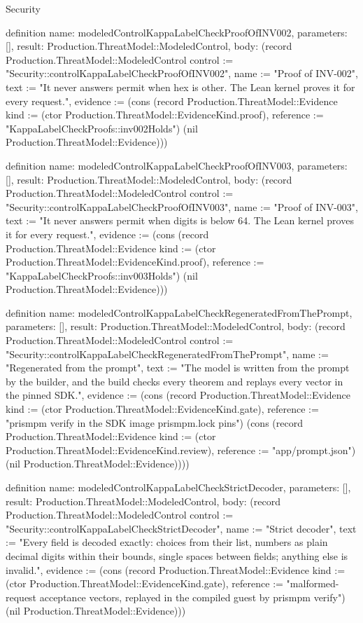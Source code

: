 \begin{lexlean}{Security}
\begin{semanticmodule}
definition{
  name: modeledControlKappaLabelCheckProofOfINV002,
  parameters: [],
  result: Production.ThreatModel::ModeledControl,
  body: (record Production.ThreatModel::ModeledControl {control := "Security::controlKappaLabelCheckProofOfINV002", name := "Proof of INV-002", text := "It never answers permit when hex is other. The Lean kernel proves it for every request.", evidence := (cons (record Production.ThreatModel::Evidence {kind := (ctor Production.ThreatModel::EvidenceKind.proof), reference := "KappaLabelCheckProofs::inv002Holds"}) (nil Production.ThreatModel::Evidence))})
}

definition{
  name: modeledControlKappaLabelCheckProofOfINV003,
  parameters: [],
  result: Production.ThreatModel::ModeledControl,
  body: (record Production.ThreatModel::ModeledControl {control := "Security::controlKappaLabelCheckProofOfINV003", name := "Proof of INV-003", text := "It never answers permit when digits is below 64. The Lean kernel proves it for every request.", evidence := (cons (record Production.ThreatModel::Evidence {kind := (ctor Production.ThreatModel::EvidenceKind.proof), reference := "KappaLabelCheckProofs::inv003Holds"}) (nil Production.ThreatModel::Evidence))})
}

definition{
  name: modeledControlKappaLabelCheckRegeneratedFromThePrompt,
  parameters: [],
  result: Production.ThreatModel::ModeledControl,
  body: (record Production.ThreatModel::ModeledControl {control := "Security::controlKappaLabelCheckRegeneratedFromThePrompt", name := "Regenerated from the prompt", text := "The model is written from the prompt by the builder, and the build checks every theorem and replays every vector in the pinned SDK.", evidence := (cons (record Production.ThreatModel::Evidence {kind := (ctor Production.ThreatModel::EvidenceKind.gate), reference := "prismpm verify in the SDK image prismpm.lock pins"}) (cons (record Production.ThreatModel::Evidence {kind := (ctor Production.ThreatModel::EvidenceKind.review), reference := "app/prompt.json"}) (nil Production.ThreatModel::Evidence)))})
}

definition{
  name: modeledControlKappaLabelCheckStrictDecoder,
  parameters: [],
  result: Production.ThreatModel::ModeledControl,
  body: (record Production.ThreatModel::ModeledControl {control := "Security::controlKappaLabelCheckStrictDecoder", name := "Strict decoder", text := "Every field is decoded exactly: choices from their list, numbers as plain decimal digits within their bounds, single spaces between fields; anything else is invalid.", evidence := (cons (record Production.ThreatModel::Evidence {kind := (ctor Production.ThreatModel::EvidenceKind.gate), reference := "malformed-request acceptance vectors, replayed in the compiled guest by prismpm verify"}) (nil Production.ThreatModel::Evidence))})
}


\end{semanticmodule}
\end{lexlean}
